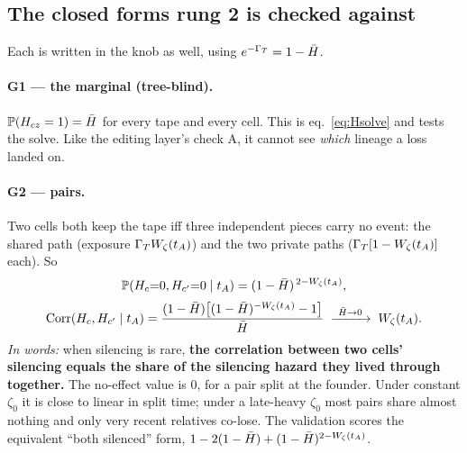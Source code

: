 \subsection{The closed forms rung 2 is checked against}\label{sec:drop2cf}

Each is written in the knob as well, using $e^{-\Gamma_T}=1-\bar H$.

\paragraph{G1 --- the marginal (tree-blind).} $\mathbb{P}(H_{cz}=1)=\bar H$ for every tape and every cell.
This is eq.~\eqref{eq:Hsolve} and tests the solve. Like the editing layer's check A, it cannot see
\emph{which} lineage a loss landed on.

\paragraph{G2 --- pairs.} Two cells both keep the tape iff three independent pieces carry no event: the
shared path (exposure $\Gamma_T W_\zeta(t_A)$) and the two private paths ($\Gamma_T[1-W_\zeta(t_A)]$ each).
So
\begin{equation}
\begin{gathered}
  \mathbb{P}(H_c{=}0,H_{c'}{=}0\mid t_A)=(1-\bar H)^{\,2-W_\zeta(t_A)},\\[2pt]
  \mathrm{Corr}(H_c,H_{c'}\mid t_A)=\frac{(1-\bar H)\big[(1-\bar H)^{-W_\zeta(t_A)}-1\big]}{\bar H}
  \;\xrightarrow{\ \bar H\to0\ }\;W_\zeta(t_A).
\end{gathered}
  \label{eq:G2}
\end{equation}
\emph{In words:} when silencing is rare, \textbf{the correlation between two cells' silencing equals the
share of the silencing hazard they lived through together.} The no-effect value is $0$, for a pair split
at the founder. Under constant $\zeta_0$ it is close to linear in split time; under a late-heavy
$\zeta_0$ most pairs share almost nothing and only very recent relatives co-lose. The validation scores
the equivalent ``both silenced'' form, $1-2(1-\bar H)+(1-\bar H)^{2-W_\zeta(t_A)}$.

